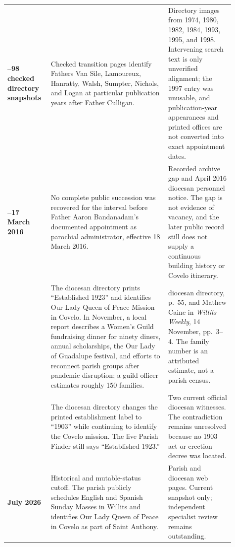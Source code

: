 \begin{longtable}{>{\bfseries\RaggedRight\arraybackslash}p{0.16\linewidth}>{\RaggedRight\arraybackslash}p{0.48\linewidth}>{\RaggedRight\arraybackslash}p{0.27\linewidth}}
1974--98 checked directory snapshots & Checked transition pages identify Fathers Van Sile, Lamoureux, Hanratty, Walsh, Sumpter, Nichols, and Logan at particular publication years after Father Culligan. & Directory images from 1974, 1980, 1982, 1984, 1993, 1995, and 1998. Intervening search text is only unverified alignment; the 1997 entry was unusable, and publication-year appearances and printed offices are not converted into exact appointment dates.\\

2001--17 March 2016 & No complete public succession was recovered for the interval before Father Aaron Bandanadam's documented appointment as parochial administrator, effective 18 March 2016. & Recorded archive gap and April 2016 diocesan personnel notice. The gap is not evidence of vacancy, and the later public record still does not supply a continuous building history or Covelo itinerary.\\

2024 & The diocesan directory prints ``Established 1923'' and identifies Our Lady Queen of Peace Mission in Covelo. In November, a local report describes a Women's Guild fundraising dinner for ninety diners, annual scholarships, the Our Lady of Guadalupe festival, and efforts to reconnect parish groups after pandemic disruption; a guild officer estimates roughly 150 families. & 2024 diocesan directory, p.~55, and Mathew Caine in \emph{Willits Weekly}, 14 November, pp.~3--4. The family number is an attributed estimate, not a parish census.\\

2026 & The diocesan directory changes the printed establishment label to ``1903'' while continuing to identify the Covelo mission. The live Parish Finder still says ``Established 1923.'' & Two current official diocesan witnesses. The contradiction remains unresolved because no 1903 act or erection decree was located.\\

21 July 2026 & Historical and mutable-status cutoff. The parish publicly schedules English and Spanish Sunday Masses in Willits and identifies Our Lady Queen of Peace in Covelo as part of Saint Anthony. & Parish and diocesan web pages. Current snapshot only; independent specialist review remains outstanding.\\
\end{longtable}
